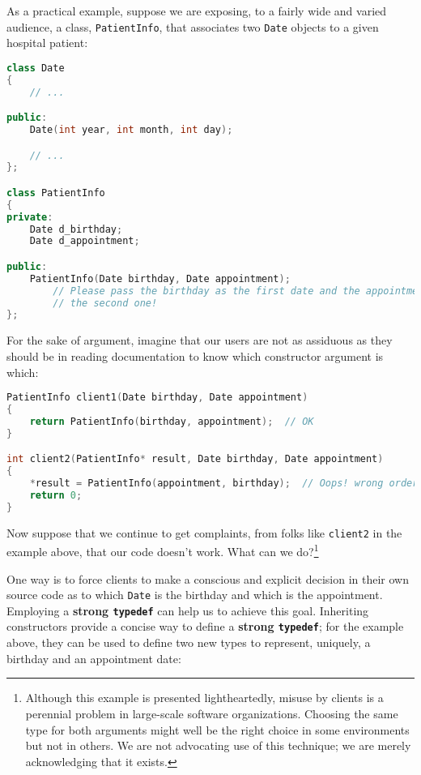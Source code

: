 As a practical example, suppose we are exposing, to a fairly wide and varied audience, a class,
\texttt{PatientInfo}, that associates two \texttt{Date} objects to a
given hospital patient:

\begin{lstlisting}[language=C++]
class Date
{
    // ...

public:
    Date(int year, int month, int day);

    // ...
};

class PatientInfo
{
private:
    Date d_birthday;
    Date d_appointment;

public:
    PatientInfo(Date birthday, Date appointment);
        // Please pass the birthday as the first date and the appointment as
        // the second one!
};
\end{lstlisting}
    
\noindent For the sake of argument, imagine that our users are not as assiduous as
they should be in reading documentation to know which constructor
argument is which:

\begin{lstlisting}[language=C++]
PatientInfo client1(Date birthday, Date appointment)
{
    return PatientInfo(birthday, appointment);  // OK
}

int client2(PatientInfo* result, Date birthday, Date appointment)
{
    *result = PatientInfo(appointment, birthday);  // Oops! wrong order
    return 0;
}
\end{lstlisting}
    
\noindent Now suppose that we continue to get complaints, from folks like
\texttt{client2} in the example above, that our code doesn't work. What can we
do?{\cprotect\footnote{Although this example is presented lightheartedly, misuse by clients is a perennial problem in large-scale
software organizations. Choosing the same type for both arguments
might well be the right choice in some environments but not in others.
We are not advocating use of this technique; we are merely
  acknowledging that it exists.}}

One way is to force clients to make a conscious and explicit decision in
their own source code as to which \texttt{Date} is the birthday and
which is the appointment. Employing a \textbf{strong \texttt{typedef}}
can help us to achieve this goal. Inheriting constructors provide a
concise way to define a \textbf{strong \texttt{typedef}}; for
the example above, they can be used to define two new types to
represent, uniquely, a birthday and an appointment date:

